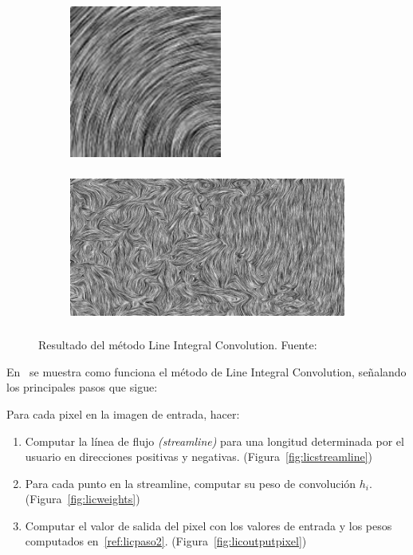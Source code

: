 \begin{figure}[h!]
	\centering	
	\begin{subfigure}{.45\textwidth}
		\includegraphics[height=5cm,width=\textwidth]{figures/lic2.png}
	\end{subfigure}
	\hfill
	\begin{subfigure}{.45\textwidth}
		\includegraphics[height=5cm,width=\textwidth]{figures/lic1.png}
	\end{subfigure}
	\caption[Resultado del método Line Integral Convolution.]{Resultado del
			método Line Integral Convolution. Fuente:~\cite{osti_10185520}}
	\label{fig:lic}
\end{figure}

En~\citet{licthesis} se muestra como funciona el método de Line Integral
Convolution, señalando los principales pasos que sigue:

Para cada pixel en la imagen de entrada, hacer:
\begin{enumerate}
		\item Computar la línea de flujo \textit{(streamline)} para una longitud
				determinada por el usuario en direcciones positivas y
				negativas. (Figura~\ref{fig:licstreamline})
		\item \label{ref:licpaso2} Para cada punto en la streamline, computar su
				peso de convolución $h_i$. (Figura~\ref{fig:licweights})
		\item Computar el valor de salida del pixel con los valores de entrada y
				los pesos computados en~\ref{ref:licpaso2}.
				(Figura~\ref{fig:licoutputpixel})
\end{enumerate}

